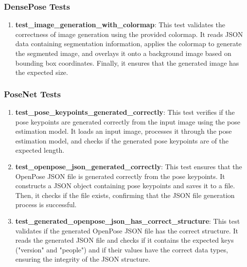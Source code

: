     \subsubsection{DensePose Tests}

    \begin{enumerate}
        \item \textbf{test\_image\_generation\_with\_colormap}: This test validates the correctness of image generation using the provided colormap. It reads JSON data containing segmentation information, applies the colormap to generate the segmented image, and overlays it onto a background image based on bounding box coordinates. Finally, it ensures that the generated image has the expected size.
    \end{enumerate}

    \subsubsection{PoseNet Tests}

    \begin{enumerate}
        \item \textbf{test\_pose\_keypoints\_generated\_correctly}: This test verifies if the pose keypoints are generated correctly from the input image using the pose estimation model. It loads an input image, processes it through the pose estimation model, and checks if the generated pose keypoints are of the expected length.
        
        \item \textbf{test\_openpose\_json\_generated\_correctly}: This test ensures that the OpenPose JSON file is generated correctly from the pose keypoints. It constructs a JSON object containing pose keypoints and saves it to a file. Then, it checks if the file exists, confirming that the JSON file generation process is successful.
        
        \item \textbf{test\_generated\_openpose\_json\_has\_correct\_structure}: This test validates if the generated OpenPose JSON file has the correct structure. It reads the generated JSON file and checks if it contains the expected keys ("version" and "people") and if their values have the correct data types, ensuring the integrity of the JSON structure.
    \end{enumerate}
